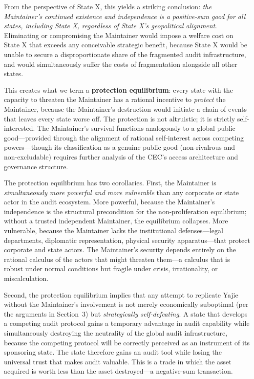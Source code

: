 \documentclass[12pt,a4paper]{ctexart}
\theoremstyle{definition}
\theoremstyle{remark}
\begin{document}
From the perspective of State X, this yields a striking conclusion: \textit{the Maintainer's continued existence and independence is a positive-sum good for all states, including State X, regardless of State X's geopolitical alignment}. Eliminating or compromising the Maintainer would impose a welfare cost on State X that exceeds any conceivable strategic benefit, because State X would be unable to secure a disproportionate share of the fragmented audit infrastructure, and would simultaneously suffer the costs of fragmentation alongside all other states.

This creates what we term a \textbf{protection equilibrium}: every state with the capacity to threaten the Maintainer has a rational incentive to \textit{protect} the Maintainer, because the Maintainer's destruction would initiate a chain of events that leaves every state worse off. The protection is not altruistic; it is strictly self-interested. The Maintainer's survival functions analogously to a global public good—provided through the alignment of rational self-interest across competing powers—though its classification as a genuine public good (non-rivalrous and non-excludable) requires further analysis of the CEC's access architecture and governance structure.

The protection equilibrium has two corollaries. First, the Maintainer is \textit{simultaneously more powerful and more vulnerable} than any corporate or state actor in the audit ecosystem. More powerful, because the Maintainer's independence is the structural precondition for the non-proliferation equilibrium; without a trusted independent Maintainer, the equilibrium collapses. More vulnerable, because the Maintainer lacks the institutional defenses—legal departments, diplomatic representation, physical security apparatus—that protect corporate and state actors. The Maintainer's security depends entirely on the rational calculus of the actors that might threaten them—a calculus that is robust under normal conditions but fragile under crisis, irrationality, or miscalculation.

Second, the protection equilibrium implies that any attempt to replicate Yajie without the Maintainer's involvement is not merely economically suboptimal (per the arguments in Section~3) but \textit{strategically self-defeating}. A state that develops a competing audit protocol gains a temporary advantage in audit capability while simultaneously destroying the neutrality of the global audit infrastructure, because the competing protocol will be correctly perceived as an instrument of its sponsoring state. The state therefore gains an audit tool while losing the universal trust that makes audit valuable. This is a trade in which the asset acquired is worth less than the asset destroyed—a negative-sum transaction.
\end{document}
